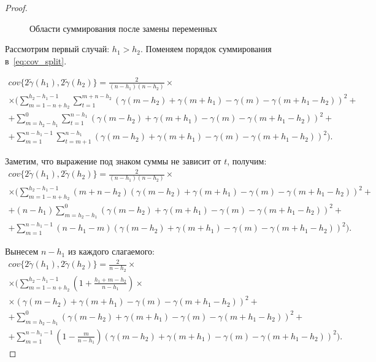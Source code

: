 \begin{proof}
\begin{figure}[H]
	\caption{Области суммирования после замены переменных}
\label{fig:label}
\end{figure}

Рассмотрим первый случай: $h_1 > h_2$. Поменяем порядок суммирования в~\eqref{eq:cov_split}.

\begin{equation*}\begin{gathered}
	cov\{ 2 \tilde{\gamma}(h_1), 2 \tilde{\gamma}(h_2) \} = \frac{2}{(n - h_1) (n - h_2)} \times \\
	\times (\sum_{m = 1 - n + h_2}^{h_2 - h_1 - 1}\sum_{t = 1}^{m + n - h_2}(\gamma(m - h_2) + \gamma(m + h_1) - \gamma(m) - \gamma(m + h_1 - h_2))^2 + \\
	+ \sum_{m = h_2 - h_1}^{0}\sum_{t = 1}^{n - h_1}(\gamma(m - h_2) + \gamma(m + h_1) - \gamma(m) - \gamma(m + h_1 - h_2))^2 + \\
	+ \sum_{m = 1}^{n - h_1 - 1}\sum_{t = m + 1}^{n - h_1}(\gamma(m - h_2) + \gamma(m + h_1) - \gamma(m) - \gamma(m + h_1 - h_2))^2).
\end{gathered}\end{equation*}

Заметим, что выражение под знаком суммы не зависит от $t$, получим:
\begin{equation*}\begin{gathered}
	cov\{ 2 \tilde{\gamma}(h_1), 2 \tilde{\gamma}(h_2) \} = \frac{2}{(n - h_1) (n - h_2)} \times \\
	\times (\sum_{m = 1 - n + h_2}^{h_2 - h_1 - 1}(m + n - h_2)(\gamma(m - h_2) + \gamma(m + h_1) - \gamma(m) - \gamma(m + h_1 - h_2))^2 + \\
	+ (n - h_1)\sum_{m = h_2 - h_1}^{0}(\gamma(m - h_2) + \gamma(m + h_1) - \gamma(m) - \gamma(m + h_1 - h_2))^2 + \\
	+ \sum_{m = 1}^{n - h_1 - 1}(n - h_1 - m)(\gamma(m - h_2) + \gamma(m + h_1) - \gamma(m) - \gamma(m + h_1 - h_2))^2).
\end{gathered}\end{equation*}

Вынесем $ n - h_1 $ из каждого слагаемого:
\begin{equation*}\begin{gathered}
	cov\{ 2 \tilde{\gamma}(h_1), 2 \tilde{\gamma}(h_2) \} = \frac{2}{n - h_2} \times \\
	\times (\sum_{m = 1 - n + h_2}^{h_2 - h_1 - 1} (1 + \frac{h_1 + m - h_2}{n - h_1}) \times \\
	\times (\gamma(m - h_2) + \gamma(m + h_1) - \gamma(m) - \gamma(m + h_1 - h_2))^2 + \\
	+ \sum_{m = h_2 - h_1}^{0}(\gamma(m - h_2) + \gamma(m + h_1) - \gamma(m) - \gamma(m + h_1 - h_2))^2 + \\
	+ \sum_{m = 1}^{n - h_1 - 1}(1 - \frac{m}{n - h_1})(\gamma(m - h_2) + \gamma(m + h_1) - \gamma(m) - \gamma(m + h_1 - h_2))^2).
\end{gathered}\end{equation*}


\end{proof}
